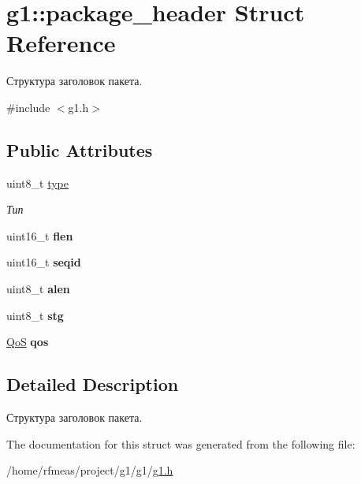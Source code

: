 \hypertarget{structg1_1_1package__header}{}\section{g1\+:\+:package\+\_\+header Struct Reference}
\label{structg1_1_1package__header}


Структура заголовок пакета.  




{\ttfamily \#include $<$g1.\+h$>$}

\subsection*{Public Attributes}
\begin{DoxyCompactItemize}
\item 
uint8\+\_\+t \hyperlink{structg1_1_1package__header_a77aeda3b76d39b1067afd494c58873af}{type}\hypertarget{structg1_1_1package__header_a77aeda3b76d39b1067afd494c58873af}{}\label{structg1_1_1package__header_a77aeda3b76d39b1067afd494c58873af}

\begin{DoxyCompactList}\small\item\em Тип \end{DoxyCompactList}\item 
uint16\+\_\+t {\bfseries flen}\hypertarget{structg1_1_1package__header_a148b733fe97c06f0ded129f2a1d953c1}{}\label{structg1_1_1package__header_a148b733fe97c06f0ded129f2a1d953c1}

\item 
uint16\+\_\+t {\bfseries seqid}\hypertarget{structg1_1_1package__header_a8f706d30ff3d9154aff97827aa291af8}{}\label{structg1_1_1package__header_a8f706d30ff3d9154aff97827aa291af8}

\item 
uint8\+\_\+t {\bfseries alen}\hypertarget{structg1_1_1package__header_aca2dc89b824e81d9aaa99488aab21fe7}{}\label{structg1_1_1package__header_aca2dc89b824e81d9aaa99488aab21fe7}

\item 
uint8\+\_\+t {\bfseries stg}\hypertarget{structg1_1_1package__header_ade59c95e617ca8789a408c9aaa0ab088}{}\label{structg1_1_1package__header_ade59c95e617ca8789a408c9aaa0ab088}

\item 
\hyperlink{g1_8h_a157fb77f1b8142697dc1b88efaae6a0a}{QoS} {\bfseries qos}\hypertarget{structg1_1_1package__header_aea47ad75b2af7d91d1f460ff5887c751}{}\label{structg1_1_1package__header_aea47ad75b2af7d91d1f460ff5887c751}

\end{DoxyCompactItemize}


\subsection{Detailed Description}
Структура заголовок пакета. 

The documentation for this struct was generated from the following file\+:\begin{DoxyCompactItemize}
\item 
/home/rfmeas/project/g1/g1/\hyperlink{g1_8h}{g1.\+h}\end{DoxyCompactItemize}
